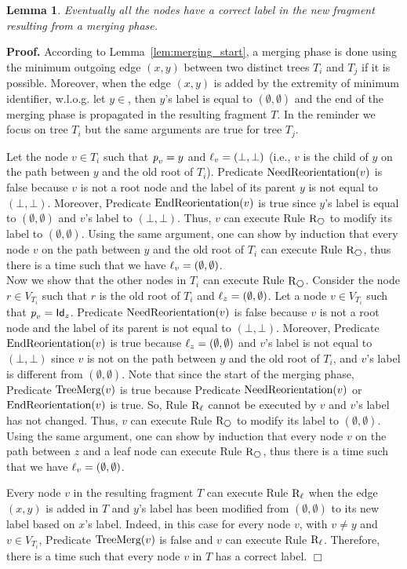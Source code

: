 \documentclass[11pt,a4paper]{article}
\newtheorem{lemma}{Lemma}
\newenvironment{proof}{\noindent \begin{rm}{\textbf{Proof.} }}{\hspace*{\fill}$\Box$\par\end{rm}}
\newcommand{\id}{\mbox{\sf Id}}
\newcommand{\parent}{\mbox{\it p}}
\newcommand{\lab}{\mbox{\rm $\ell$}}
\newcommand{\NeedReorientation}{\mbox{\rm NeedReorientation}}
\newcommand{\EndReorientation}{\mbox{\rm EndReorientation}}
\newcommand{\TreeChange}{\mbox{\rm TreeMerg}}
\newcommand{\REnd}{\mbox{\rm R$_{\hexagon}$}}
\begin{document}
\begin{lemma}
\label{lem:merging_end}
Eventually all the nodes have a correct label in the new fragment resulting from a merging phase.
\end{lemma}

\begin{proof}
According to Lemma~\ref{lem:merging_start}, a merging phase is done using the minimum outgoing edge $(x,y)$ between two distinct trees $T_i$ and $T_j$ if it is possible. Moreover, when the edge $(x,y)$ is added by the extremity of minimum identifier, w.l.o.g. let $y \in$, then $y$'s label is equal to $(\emptyset,\emptyset)$ and the end of the merging phase is propagated in the resulting fragment $T$. In the reminder we focus on tree $T_i$ but the same arguments are true for tree $T_j$.

Let the node $v \in T_i$ such that $\parent_v=y$ and $\lab_v=(\bot,\bot)$ (i.e., $v$ is the child of $y$ on the path between $y$ and the old root of $T_i$). Predicate $\NeedReorientation(v)$ is false because $v$ is not a root node and the label of its parent $y$ is not equal to $(\bot,\bot)$. Moreover, Predicate $\EndReorientation(v)$ is true since $y$'s label is equal to $(\emptyset,\emptyset)$ and $v$'s label to $(\bot,\bot)$. Thus, $v$ can execute Rule $\REnd$ to modify its label to $(\emptyset,\emptyset)$. Using the same argument, one can show by induction that every node $v$ on the path between $y$ and the old root of $T_i$ can execute Rule $\REnd$, thus there is a time such that we have $\lab_v=(\emptyset,\emptyset)$.\\
Now we show that the other nodes in $T_i$ can execute Rule $\REnd$. Consider the node $r \in V_{T_i}$ such that $r$ is the old root of $T_i$ and $\lab_z=(\emptyset,\emptyset)$. Let a node $v \in V_{T_i}$ such that $\parent_v=\id_z$. Predicate $\NeedReorientation(v)$ is false because $v$ is not a root node and the label of its parent is not equal to $(\bot,\bot)$. Moreover, Predicate $\EndReorientation(v)$ is true because $\lab_z=(\emptyset,\emptyset)$ and $v$'s label is not equal to $(\bot,\bot)$ since $v$ is not on the path between $y$ and the old root of $T_i$, and $v$'s label is different from $(\emptyset,\emptyset)$. Note that since the start of the merging phase, Predicate $\TreeChange(v)$ is true because Predicate $\NeedReorientation(v)$ or $\EndReorientation(v)$ is true. So, Rule $\mbox{\rm R$_{\ell}$}$ cannot be executed by $v$ and $v$'s label has not changed. Thus, $v$ can execute Rule $\REnd$ to modify its label to $(\emptyset,\emptyset)$. Using the same argument, one can show by induction that every node $v$ on the path between $z$ and a leaf node can execute Rule $\REnd$, thus there is a time such that we have $\lab_v=(\emptyset,\emptyset)$.

Every node $v$ in the resulting fragment $T$ can execute Rule $\mbox{\rm R$_{\ell}$}$ when the edge $(x,y)$ is added in $T$ and $y$'s label has been modified from $(\emptyset,\emptyset)$ to its new label based on $x$'s label. Indeed, in this case for every node $v$, with $v \neq y$ and $v \in V_{T_i}$, Predicate $\TreeChange(v)$ is false and $v$ can execute Rule $\mbox{\rm R$_{\ell}$}$. Therefore, there is a time such that every node $v$ in $T$ has a correct label.
\end{proof}
\end{document}
